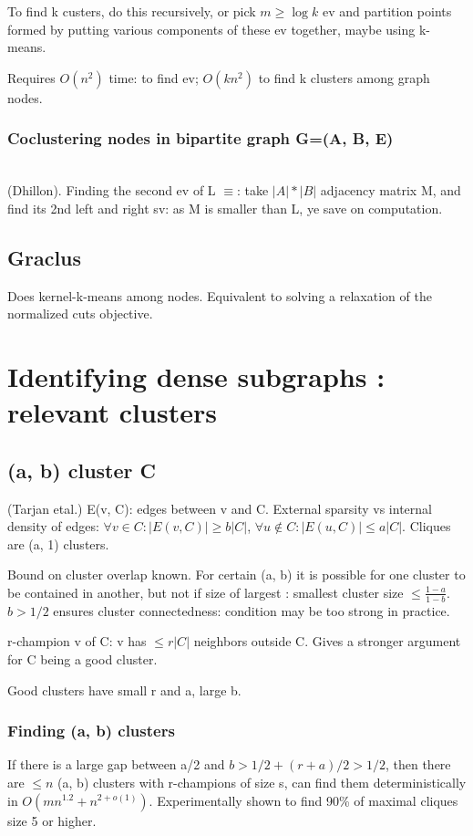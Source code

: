 \documentclass[oneside, article]{memoir}
\begin{document}
To find k custers, do this recursively, or pick $m \geq \log k$ ev and partition points formed by putting various components of these ev together, maybe using k-means.

Requires $O(n^{2})$ time: to find ev; $O(kn^{2})$ to find k clusters among graph nodes.

\subsection{Coclustering nodes in bipartite graph G=(A, B, E)}
\core \\
(Dhillon). Finding the second ev of L $\equiv$: take $|A|*|B|$ adjacency matrix M, and find its 2nd left and right sv: as M is smaller than L, ye save on computation.

\section{Graclus}
Does kernel-k-means among nodes. Equivalent to solving a relaxation of the normalized cuts objective.

\chapter{Identifying dense subgraphs : relevant clusters}
\section{(a, b) cluster C}
(Tarjan etal.) E(v, C): edges between v and C. External sparsity vs internal density of edges: $\forall v \in C: |E(v, C)|\geq b|C|$, $\forall u \notin C: |E(u, C)|\leq a|C|$. Cliques are (a, 1) clusters.

Bound on cluster overlap known. For certain (a, b) it is possible for one cluster to be contained in another, but not if size of largest : smallest cluster size $\leq \frac{1-a}{1-b}$. $b>1/2$ ensures cluster connectedness: condition may be too strong in practice.

r-champion v of C: v has $\leq r|C|$ neighbors outside C. Gives a stronger argument for C being a good cluster.

Good clusters have small r and a, large b.

\subsection{Finding (a, b) clusters}
If there is a large gap between a/2 and $b > 1/2 + (r+a)/2 > 1/2$, then there are $\leq n$ (a, b) clusters with r-champions of size s, can find them deterministically  in $O(mn^{1.2}+n^{2+o(1)})$. Experimentally shown to find 90\% of maximal cliques size 5 or higher.
\end{document}
